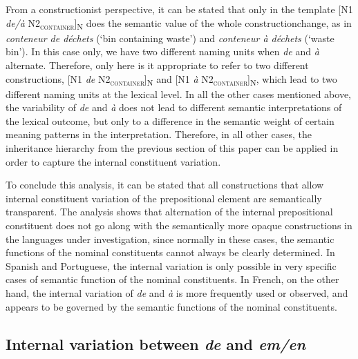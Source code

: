 \documentclass[output=paper]{langsci/langscibook}
\begin{document}
From a constructionist perspective, it can be stated that only in the template [N1 \textit{de/à} N2\textsubscript{\scshape container}]\textsubscript{N} does the semantic value of the whole construction\linebreak change, as in \textit{conteneur de déchets} (`bin containing waste') and \textit{conteneur à déchets} (`waste bin'). In this case only, we have two different naming units when \textit{de} and \textit{à} alternate. Therefore, only here is it appropriate to refer to two different constructions, [N1 \textit{de} N2\textsubscript{\scshape container}]\textsubscript{N} and  [N1 \textit{à} N2\textsubscript{\scshape container}]\textsubscript{N}, which lead to two different naming units at the lexical level. In all the other cases mentioned above, the variability of \textit{de} and \textit{à} does not lead to different semantic interpretations of the lexical outcome, but only to a difference in the semantic weight of certain meaning patterns in the interpretation. Therefore, in all other cases, the inheritance hierarchy from the previous section of this paper can be applied in order to capture the internal constituent variation.

To conclude this analysis, it can be stated that all constructions that allow internal constituent variation of the prepositional element are semantically transparent.  The analysis shows that alternation of the internal prepositional constituent does not go along with the semantically more opaque constructions in the languages under investigation, since normally in these cases, the semantic functions of the nominal constituents cannot always be clearly determined. In Spanish and Portuguese, the internal variation is only possible in very specific cases of semantic function of the nominal constituents. In French, on the other hand, the internal variation of \textit{de} and \textit{à} is more frequently used or observed, and appears to be governed by the semantic functions of the nominal constituents.

\subsection{Internal variation between \textit{de} and \textit{em/en}}
\end{document}
